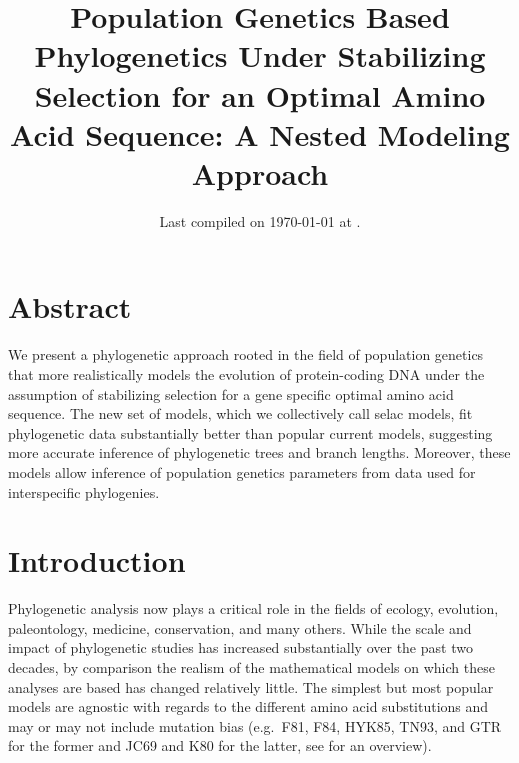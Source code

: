 \documentclass{article}
\title{Population Genetics Based Phylogenetics Under Stabilizing Selection for an Optimal Amino Acid Sequence: A Nested Modeling Approach
} \date{Last compiled on \today\xspace at \currenttime.}
\begin{document}
\maketitle


\section*{Abstract}
We present a phylogenetic approach rooted in the field of population genetics that more realistically models the evolution of protein-coding DNA under the assumption of stabilizing selection for a gene specific optimal amino acid sequence.
The new set of models, which we collectively call selac models, fit phylogenetic data substantially better than popular current models, suggesting more accurate inference of phylogenetic trees and branch lengths.
Moreover, these models allow inference of population genetics parameters from data used for interspecific phylogenies.

\section*{Introduction}
Phylogenetic analysis now plays a critical role in the fields of ecology, evolution, paleontology, medicine, conservation, and many others.
While the scale and impact of phylogenetic studies has increased substantially over the past two decades, by comparison the realism of the mathematical models on which these analyses are based has changed relatively little.
The simplest but most popular models are agnostic with regards to the different amino acid substitutions and may or may not include mutation bias (e.g.~F81, F84, HYK85, TN93, and GTR for the former and JC69 and K80 for the latter, see \citet{Yang2014} for an overview).
\end{document}
